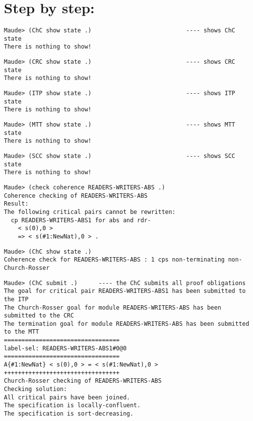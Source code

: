 \documentclass{article}
\begin{document}
\section{Step by step:}


\begin{lstlisting}[style=AMMA, language=Maude, numbers=none]
Maude> (ChC show state .)                           ---- shows ChC state
There is nothing to show!
\end{lstlisting}

\begin{lstlisting}[style=AMMA, language=Maude, numbers=none]
Maude> (CRC show state .)                           ---- shows CRC state
There is nothing to show!
\end{lstlisting}

\begin{lstlisting}[style=AMMA, language=Maude, numbers=none]
Maude> (ITP show state .)                           ---- shows ITP state
There is nothing to show!
\end{lstlisting}

\begin{lstlisting}[style=AMMA, language=Maude, numbers=none]
Maude> (MTT show state .)                           ---- shows MTT state
There is nothing to show!
\end{lstlisting}

\begin{lstlisting}[style=AMMA, language=Maude, numbers=none]
Maude> (SCC show state .)                           ---- shows SCC state
There is nothing to show!
\end{lstlisting}
	
\begin{lstlisting}[style=AMMA, language=Maude, numbers=none]
Maude> (check coherence READERS-WRITERS-ABS .)
Coherence checking of READERS-WRITERS-ABS
Result:
The following critical pairs cannot be rewritten:
  cp READERS-WRITERS-ABS1 for abs and rdr-
    < s(0),0 >
    => < s(#1:NewNat),0 > .
\end{lstlisting}

\begin{lstlisting}[style=AMMA, language=Maude, numbers=none]
Maude> (ChC show state .)
Coherence check for READERS-WRITERS-ABS : 1 cps non-terminating non-Church-Rosser
\end{lstlisting}

\begin{lstlisting}[style=AMMA, language=Maude, numbers=none]
Maude> (ChC submit .)      ---- the ChC submits all proof obligations 
The goal for critical pair READERS-WRITERS-ABS1 has been submitted to the ITP
The Church-Rosser goal for module READERS-WRITERS-ABS has been submitted to the CRC 
The termination goal for module READERS-WRITERS-ABS has been submitted to the MTT
=================================
label-sel: READERS-WRITERS-ABS1#0@0
=================================
A{#1:NewNat} < s(0),0 > = < s(#1:NewNat),0 >
+++++++++++++++++++++++++++++++++
Church-Rosser checking of READERS-WRITERS-ABS
Checking solution:
All critical pairs have been joined.
The specification is locally-confluent.
The specification is sort-decreasing.
\end{lstlisting}
\end{document}
